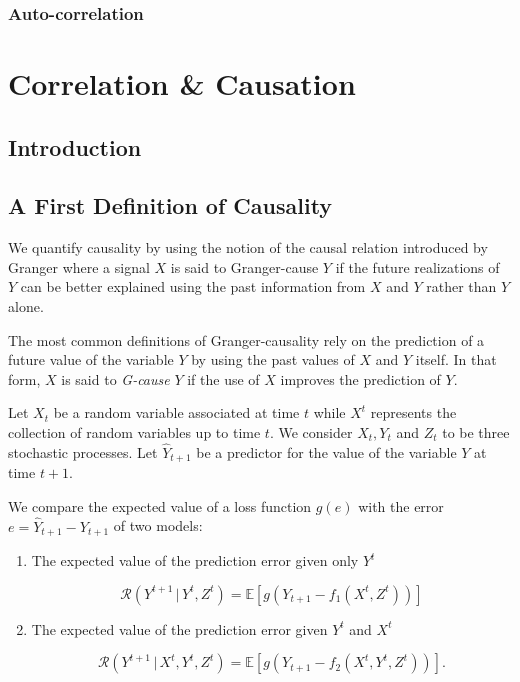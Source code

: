 \documentclass[]{book}
\providecommand{\tightlist}{%
  \setlength{\itemsep}{0pt}\setlength{\parskip}{0pt}}
\theoremstyle{definition}
\theoremstyle{definition}
\theoremstyle{definition}
\theoremstyle{remark}
\begin{document}
\subsection{Auto-correlation}\label{auto-correlation}

\chapter{Correlation \& Causation}\label{correlation-causation}

\section{Introduction}\label{introduction-1}

\section{A First Definition of
Causality}\label{a-first-definition-of-causality}

We quantify causality by using the notion of the causal relation
introduced by Granger \citep{Wiener56, granger:econ} where a signal
\(X\) is said to Granger-cause \(Y\) if the future realizations of \(Y\)
can be better explained using the past information from \(X\) and \(Y\)
rather than \(Y\) alone.

The most common definitions of Granger-causality rely on the prediction
of a future value of the variable \(Y\) by using the past values of
\(X\) and \(Y\) itself. In that form, \(X\) is said to \emph{G-cause}
\(Y\) if the use of \(X\) improves the prediction of \(Y\).

Let \(X_t\) be a random variable associated at time \(t\) while \(X^t\)
represents the collection of random variables up to time \(t\). We
consider \({X_t}, {Y_t}\) and \({Z_t}\) to be three stochastic
processes. Let \(\hat Y_{t+1}\) be a predictor for the value of the
variable \(Y\) at time \(t+1\).

We compare the expected value of a loss function \(g(e)\) with the error
\(e=\hat{Y}_{t+1} - Y_{t+1}\) of two models:

\begin{enumerate}
\def\labelenumi{\arabic{enumi}.}
\tightlist
\item
  The expected value of the prediction error given only \(Y^t\)

  \begin{equation}
   \mathcal{R}(Y^{t+1} \, | \, Y^t,Z^t) = \mathbb{E}[g(Y_{t+1} - f_1(X^{t},Z^t))]
  \end{equation}
\item
  The expected value of the prediction error given \(Y^t\) and \(X^t\)

  \begin{equation}
   \mathcal{R}(Y^{t+1} \, | \, X^{t},Y^t,Z^t) = \mathbb{E}[g(Y_{t+1} - f_2(X^{t},Y^t,Z^t))].
  \end{equation}
\end{enumerate}
\end{document}
